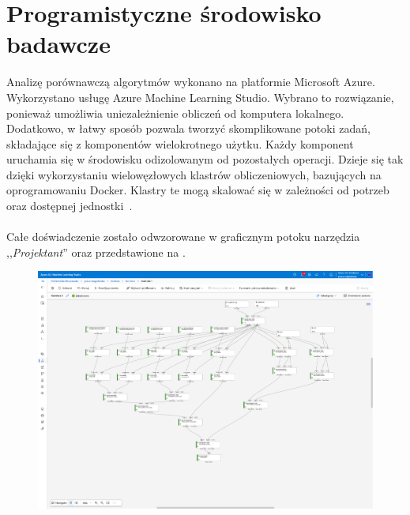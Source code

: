 \section{Programistyczne środowisko badawcze}
Analizę porównawczą algorytmów wykonano na platformie Microsoft Azure. Wykorzystano usługę Azure Machine Learning Studio. Wybrano to rozwiązanie, ponieważ umożliwia uniezależnienie obliczeń od komputera lokalnego. Dodatkowo, w łatwy sposób pozwala tworzyć skomplikowane potoki zadań, składające się z komponentów wielokrotnego użytku. Każdy komponent uruchamia się w środowisku odizolowanym od pozostałych operacji. Dzieje się tak dzięki wykorzystaniu wielowęzłowych klastrów obliczeniowych, bazujących na oprogramowaniu Docker. Klastry te mogą skalować się w zależności od potrzeb oraz dostępnej jednostki~\cite{MicrosoftLearn2023}.
\\ \\
Całe doświadczenie zostało odwzorowane w graficznym potoku narzędzia ,,\textit{Projektant}'' oraz przedstawione na .

\begin{landscape}
    \centering
    \begin{figure}[H]
        \centering
        \includegraphics[height=0.9\textwidth]{images/pipeline}
        \label{fig:pipeline}
    \end{figure}
\end{landscape}

